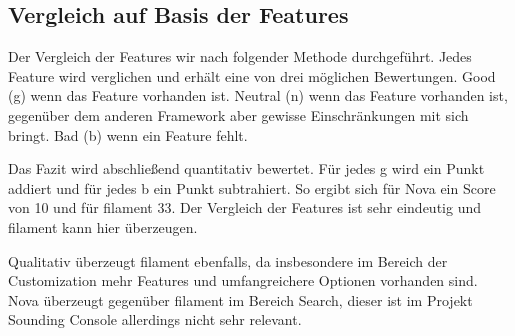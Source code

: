 \subsection{Vergleich auf Basis der Features}

\newpage

Der Vergleich der Features wir nach folgender Methode durchgeführt.
Jedes Feature wird verglichen und erhält eine von drei möglichen Bewertungen.
Good (g) wenn das Feature vorhanden ist.
Neutral (n) wenn das Feature vorhanden ist, gegenüber dem anderen Framework aber gewisse Einschränkungen mit sich bringt.
Bad (b) wenn ein Feature fehlt.

Das Fazit wird abschließend quantitativ bewertet.
Für jedes g wird ein Punkt addiert und für jedes b ein Punkt subtrahiert.
So ergibt sich für Nova ein Score von 10 und für filament 33.
Der Vergleich der Features ist sehr eindeutig und filament kann hier überzeugen.

Qualitativ überzeugt filament ebenfalls, da insbesondere im Bereich der Customization mehr Features und umfangreichere Optionen vorhanden sind.
Nova überzeugt gegenüber filament im Bereich Search, dieser ist im Projekt Sounding Console allerdings nicht sehr relevant.
